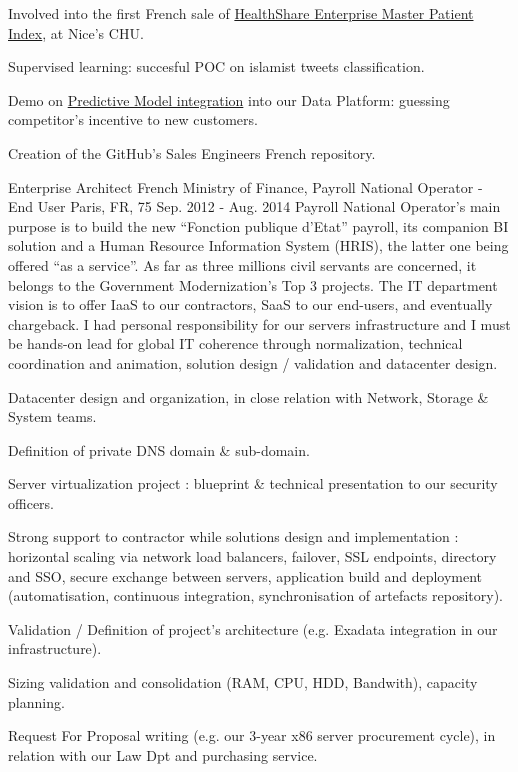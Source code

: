 \begin{cventries}
{\begin{cvitems}
        \item {Involved into the first French sale of \href{https://www.intersystems.com/products/healthshare/patient-index/}{HealthShare Enterprise Master Patient Index}, at Nice's CHU.}
        \item {Supervised learning: succesful POC on islamist tweets classification.}
        \item {Demo on \href{https://learning.intersystems.com/pluginfile.php/15024/mod_resource/content/4/AnInterSystemsGuideToTheDataGalaxy.pdf}{Predictive Model integration} into our Data Platform: guessing competitor's incentive to new customers.}
        \item {Creation of the GitHub's Sales Engineers French repository.}
      \end{cvitems}
} %

  \cventry
    {Enterprise Architect} %
    {French Ministry of Finance, Payroll National Operator - End User} %
    {Paris, FR, 75} %
    {Sep. 2012 - Aug. 2014} %
{
Payroll National Operator’s main purpose is to build the new “Fonction publique d’Etat” payroll, its companion BI solution and a Human Resource Information System (HRIS), the latter one being offered “as a service”. As far as three millions civil servants are concerned, it belongs to the Government Modernization's Top 3 projects.
The IT department vision is to offer IaaS to our contractors, SaaS to our end-users, and eventually chargeback.
I had personal responsibility for our servers infrastructure and I must be hands-on lead for global IT coherence through normalization, technical coordination and animation, solution design / validation and datacenter design.
} %
{
      \begin{cvitems} %
        \item {Datacenter design and organization, in close relation with Network, Storage \& System teams.}
        \item {Definition of private DNS domain \& sub-domain.}
        \item {Server virtualization project : blueprint \& technical presentation to our security officers.}
        \item {Strong support to contractor while solutions design and implementation : horizontal scaling via network load balancers, failover, SSL endpoints, directory and SSO, secure exchange between servers, application build and deployment (automatisation, continuous integration, synchronisation of artefacts repository).}
        \item {Validation / Definition of project’s architecture (e.g. Exadata integration in our infrastructure).}
        \item {Sizing validation and consolidation (RAM, CPU, HDD, Bandwith), capacity planning.}
        \item {Request For Proposal writing (e.g. our 3-year x86 server procurement cycle), in relation with our Law Dpt and purchasing service.}
      \end{cvitems}
} %


\end{cventries}

